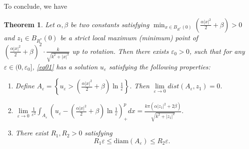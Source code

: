 \documentclass[12pt,reqno]{amsart}
\numberwithin{equation}{section}
\newtheorem{theorem}{Theorem}[section]
\theoremstyle{definition}
\theoremstyle{remark}
\begin{document}
To conclude, we have
\begin{theorem}\label{thmA}
Let $ \alpha,\beta $ be two constants satisfying $ \min_{x\in B_{R^*}(0)}\left( \frac{\alpha|x|^2}{2}+\beta\right) >0 $ and $ z_1\in B_{R^*}(0)$ be a strict local maximum (minimum) point of $ \left( \frac{\alpha|x|^2}{2}+\beta\right)^2\cdot \frac{k}{\sqrt{k^2+|x|^2}} $ up to rotation. Then there exists $ \varepsilon_0>0 $, such that for any $ \varepsilon\in(0,\varepsilon_0] $, \eqref{eq01} has a solution $ u_\varepsilon $ satisfying the following properties:
\begin{enumerate}
	\item  Define $ A_\varepsilon=\left\{u_\varepsilon>\left( \frac{\alpha|x|^2}{2}+\beta\right)\ln\frac{1}{\varepsilon}\right\} $. Then $ \lim\limits_{\varepsilon\to 0}dist(A_\varepsilon, z_1)=0 $.
	\item $ \lim\limits_{\varepsilon\to 0}\frac{1}{\varepsilon^2}\int_{A_\varepsilon}\left( u_\varepsilon-\left( \frac{\alpha|x|^2}{2}+\beta\right)\ln\frac{1}{\varepsilon}\right)^p_+dx=\frac{k\pi(\alpha|z_1|^2+2\beta)}{\sqrt{k^2+|z_1|^2}}. $
	\item There exist  $ R_1,R_2>0 $ satisfying
	\begin{equation*}
	R_1\varepsilon\leq \text{diam}(A_\varepsilon)\leq R_2\varepsilon.
	\end{equation*}
	
\end{enumerate}
\end{theorem}


\bigskip
\end{document}
